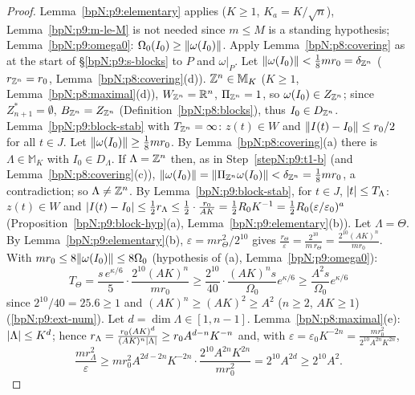 \begin{proof}
\label{stepN:p9:t1-par} Lemma~\ref{bpN:p9:elementary} applies ($K\ge1$, $K_a=K/\sqrt n$), Lemma~\ref{bpN:p9:m-le-M} is not needed since $m\le M$ is a standing hypothesis; Lemma~\ref{bpN:p9:omega0}: $\Omega_0(I_0)\ge\lVert \omega(I_0)\rVert$. Apply Lemma~\ref{bpN:p8:covering} as at the start of \S\ref{bpN:p9:s-blocks} to $P$ and $\omega|_P$.
\label{stepN:p9:t1-b} Let $\lVert \omega(I_0)\rVert<\frac18mr_0=\delta_{\mathbb{Z}^n}$ ($r_{\mathbb{Z}^n}=r_0$, Lemma~\ref{bpN:p8:covering}(d)). $\mathbb{Z}^n\in\mathbb M_K$ ($K\ge1$, Lemma~\ref{bpN:p8:maximal}(d)), $W_{\mathbb{Z}^n}=\mathbb{R}^n$, $\Pi_{\mathbb{Z}^n}=1$, so $\omega(I_0)\in Z_{\mathbb{Z}^n}$; since $Z^*_{n+1}=\emptyset$, $B_{\mathbb{Z}^n}=Z_{\mathbb{Z}^n}$ (Definition~\ref{bpN:p8:blocks}), thus $I_0\in D_{\mathbb{Z}^n}$. Lemma~\ref{bpN:p9:block-stab} with $T_{\mathbb{Z}^n}=\infty$: $z(t)\in W$ and $\lVert I(t)-I_0\rVert\le r_0/2$ for all $t\in J$.
\label{stepN:p9:t1-a-choice} Let $\lVert \omega(I_0)\rVert\ge\frac18mr_0$. By Lemma~\ref{bpN:p8:covering}(a) there is $\Lambda\in\mathbb M_K$ with $I_0\in D_\Lambda$. If $\Lambda=\mathbb{Z}^n$ then, as in Step~\ref{stepN:p9:t1-b} (and Lemma~\ref{bpN:p8:covering}(c)), $\lVert \omega(I_0)\rVert=\lVert \Pi_{\mathbb{Z}^n}\omega(I_0)\rVert<\delta_{\mathbb{Z}^n}=\frac18mr_0$, a contradiction; so $\Lambda\ne\mathbb{Z}^n$. By Lemma~\ref{bpN:p9:block-stab}, for $t\in J$, $\lvert t\rvert\le T_\Lambda$: $z(t)\in W$ and $\lvert I(t)-I_0\rvert\le\frac12r_\Lambda\le\frac12\cdot\frac{r_0}{AK}=\frac12R_0K^{-1}=\frac12R_0(\varepsilon/\varepsilon_0)^a$ (Proposition~\ref{bpN:p9:block-hyp}(a), Lemma~\ref{bpN:p9:elementary}(b)).
\label{stepN:p9:t1-a-theta} Let $\Lambda=\Theta$. By Lemma~\ref{bpN:p9:elementary}(b), $\varepsilon=mr_\Theta^2/2^{10}$ gives $\frac{r_\Theta}\varepsilon=\frac{2^{10}}{m\,r_\Theta}=\frac{2^{10}(AK)^n}{mr_0}$. With $mr_0\le8\lVert \omega(I_0)\rVert\le8\Omega_0$ (hypothesis of (a), Lemma~\ref{bpN:p9:omega0}):
\[T_\Theta=\frac{s\,e^{\kappa/6}}{5}\cdot\frac{2^{10}(AK)^n}{mr_0}\ge\frac{2^{10}}{40}\cdot\frac{(AK)^ns}{\Omega_0}e^{\kappa/6}\ge\frac{A^2s}{\Omega_0}e^{\kappa/6}\]
since $2^{10}/40=25.6\ge1$ and $(AK)^n\ge(AK)^2\ge A^2$ ($n\ge2$, $AK\ge1$) (\ref{bpN:p9:ext-num}).
\label{stepN:p9:t1-a-res} Let $d=\dim\Lambda\in[1,n-1]$. Lemma~\ref{bpN:p8:maximal}(e): $\lvert \Lambda\rvert\le K^d$; hence $r_\Lambda=\frac{r_0(AK)^d}{(AK)^n\lvert \Lambda\rvert}\ge r_0A^{d-n}K^{-n}$ and, with $\varepsilon=\varepsilon_0K^{-2n}=\frac{mr_0^2}{2^{10}A^{2n}K^{2n}}$,
\[\frac{mr_\Lambda^2}\varepsilon\ge mr_0^2A^{2d-2n}K^{-2n}\cdot\frac{2^{10}A^{2n}K^{2n}}{mr_0^2}=2^{10}A^{2d}\ge2^{10}A^2 .\]

\end{proof}
